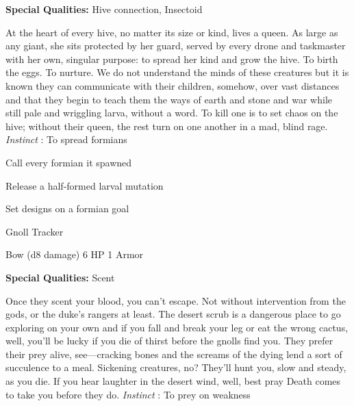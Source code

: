        


       
\startMonsterQualities
         {\bf Special Qualities:}  Hive connection, Insectoid
\stopMonsterQualities
       
\startMonsterDescription
At the heart of every hive, no matter its size or kind, lives a queen. As large as any giant, she sits protected by her guard, served by every drone and taskmaster with her own, singular purpose: to spread her kind and grow the hive. To birth the eggs. To nurture. We do not understand the minds of these creatures but it is known they can communicate with their children, somehow, over vast distances and that they begin to teach them the ways of earth and stone and war while still pale and wriggling larva, without a word. To kill one is to set chaos on the hive; without their queen, the rest turn on one another in a mad, blind rage. {\em Instinct} : To spread formians
\stopMonsterDescription
       
\startitemize[1,packed]
         
\item Call every formian it spawned

         
\item Release a half-formed larval mutation

         
\item Set designs on a formian goal

       
\stopitemize
       
\startMonsterName
Gnoll Tracker	 
\stopMonsterName
       

Bow (d8 damage)	6 HP	1 Armor

       


       
\startMonsterQualities
         {\bf Special Qualities:}  Scent
\stopMonsterQualities
       
\startMonsterDescription
Once they scent your blood, you can’t escape. Not without intervention from the gods, or the duke’s rangers at least. The desert scrub is a dangerous place to go exploring on your own and if you fall and break your leg or eat the wrong cactus, well, you’ll be lucky if you die of thirst before the gnolls find you. They prefer their prey alive, see—cracking bones and the screams of the dying lend a sort of succulence to a meal. Sickening creatures, no? They’ll hunt you, slow and steady, as you die. If you hear laughter in the desert wind, well, best pray Death comes to take you before they do. {\em Instinct} : To prey on weakness
\stopMonsterDescription
       
